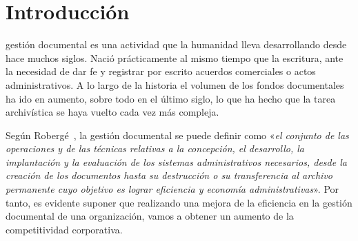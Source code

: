 \chapter{Introducción}

 gestión documental es una actividad que la humanidad lleva desarrollando desde hace muchos siglos. Nació prácticamente al mismo tiempo que la escritura, ante la necesidad de dar fe y registrar por escrito acuerdos comerciales o actos administrativos. A lo largo de la historia el volumen de los fondos documentales ha ido en aumento, sobre todo en el último siglo, lo que ha hecho que la tarea archivística se haya vuelto cada vez más compleja.

Según Robergé~\cite{roberge}, la gestión documental se puede definir como «\textit{el conjunto de las operaciones y de las técnicas relativas a la concepción, el desarrollo, la implantación y la evaluación de los sistemas administrativos necesarios, desde la creación de los documentos hasta su destrucción o su transferencia al archivo permanente cuyo objetivo es lograr eficiencia y economía administrativas}». Por tanto, es evidente suponer que realizando una mejora de la eficiencia en la gestión documental de una organización, vamos a obtener un aumento de la competitividad corporativa.


